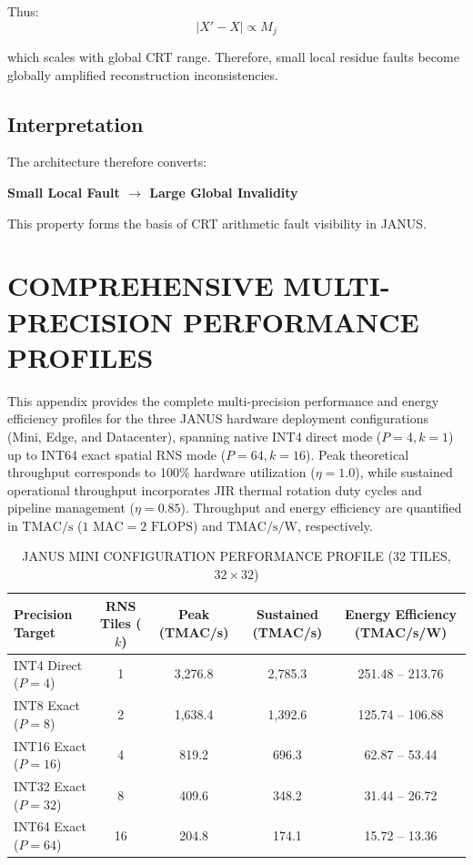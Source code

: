 \documentclass[journal]{IEEEtran}
\begin{document}
Thus:
\begin{equation}
|X ' - X| \propto M_j
\end{equation}

which scales with global CRT range. Therefore, small local residue faults become globally amplified reconstruction inconsistencies.

\subsection{\textbf{Interpretation}}

The architecture therefore converts:
\begin{center}
\textbf{Small Local Fault $\rightarrow$ Large Global Invalidity}
\end{center}

This property forms the basis of CRT arithmetic fault visibility in JANUS.

\section{COMPREHENSIVE MULTI-PRECISION PERFORMANCE PROFILES}
\label{app:perf_profiles}

This appendix provides the complete multi-precision performance and energy efficiency profiles for the three JANUS hardware deployment configurations (Mini, Edge, and Datacenter), spanning native INT4 direct mode ($P=4, k=1$) up to INT64 exact spatial RNS mode ($P=64, k=16$). Peak theoretical throughput corresponds to 100\% hardware utilization ($\eta = 1.0$), while sustained operational throughput incorporates JIR thermal rotation duty cycles and pipeline management ($\eta = 0.85$). Throughput and energy efficiency are quantified in $\text{TMAC/s}$ ($1\text{ MAC} = 2\text{ FLOPS}$) and $\text{TMAC/s/W}$, respectively.

\begin{table}[htbp]
\centering
\small
\setlength{\tabcolsep}{3pt}
\caption{JANUS MINI CONFIGURATION PERFORMANCE PROFILE (32 TILES, $32 \times 32$)}
\label{tab:table16}
\begin{tabular}{lcccc}
\toprule
Precision Target & RNS Tiles ($k$) & Peak (TMAC/s) & Sustained (TMAC/s) & Energy Efficiency (TMAC/s/W) \\
\midrule
INT4 Direct ($P=4$) & 1 & 3,276.8 & 2,785.3 & 251.48 -- 213.76 \\
INT8 Exact ($P=8$) & 2 & 1,638.4 & 1,392.6 & 125.74 -- 106.88 \\
INT16 Exact ($P=16$) & 4 & 819.2 & 696.3 & 62.87 -- 53.44 \\
INT32 Exact ($P=32$) & 8 & 409.6 & 348.2 & 31.44 -- 26.72 \\
INT64 Exact ($P=64$) & 16 & 204.8 & 174.1 & 15.72 -- 13.36 \\
\bottomrule
\end{tabular}
\end{table}
\end{document}
